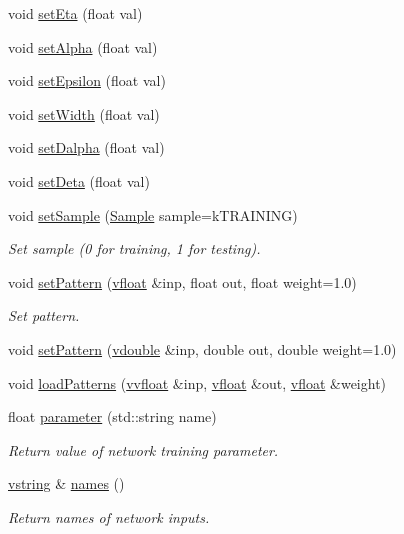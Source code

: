 \begin{CompactItemize}
void \hyperlink{classjetnet_1_1NN_a7}{set\-Eta} (float val)
\item 
void \hyperlink{classjetnet_1_1NN_a8}{set\-Alpha} (float val)
\item 
void \hyperlink{classjetnet_1_1NN_a9}{set\-Epsilon} (float val)
\item 
void \hyperlink{classjetnet_1_1NN_a10}{set\-Width} (float val)
\item 
void \hyperlink{classjetnet_1_1NN_a11}{set\-Dalpha} (float val)
\item 
void \hyperlink{classjetnet_1_1NN_a12}{set\-Deta} (float val)
\item 
void \hyperlink{classjetnet_1_1NN_a13}{set\-Sample} (\hyperlink{classjetnet_1_1NN_w17}{Sample} sample=k\-TRAINING)
\begin{CompactList}\small\item\em Set sample (0 for training, 1 for testing). \item\end{CompactList}\item 
void \hyperlink{classjetnet_1_1NN_a14}{set\-Pattern} (\hyperlink{jetnet_8hpp_a0}{vfloat} \&inp, float out, float weight=1.0)
\begin{CompactList}\small\item\em Set pattern. \item\end{CompactList}\item 
void \hyperlink{classjetnet_1_1NN_a15}{set\-Pattern} (\hyperlink{PoissonGammaFit_8hpp_a0}{vdouble} \&inp, double out, double weight=1.0)
\item 
void \hyperlink{classjetnet_1_1NN_a16}{load\-Patterns} (\hyperlink{jetnet_8hpp_a4}{vvfloat} \&inp, \hyperlink{jetnet_8hpp_a0}{vfloat} \&out, \hyperlink{jetnet_8hpp_a0}{vfloat} \&weight)
\item 
float \hyperlink{classjetnet_1_1NN_a17}{parameter} (std::string name)
\begin{CompactList}\small\item\em Return value of network training parameter. \item\end{CompactList}\item 
\hyperlink{jetnet_8hpp_a3}{vstring} \& \hyperlink{classjetnet_1_1NN_a18}{names} ()
\begin{CompactList}\small\item\em Return names of network inputs. \item\end{CompactList}\item 

\end{CompactItemize}
